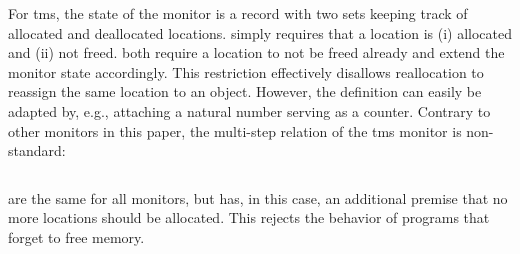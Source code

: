 \documentclass[utf8,acmsmall,review,screen,dvipsnames,anonymous]{acmart}
\begin{document}
For \gls*{tms}, the state of the monitor is a record with two sets keeping track of allocated and deallocated locations.
 simply requires that a location is (i) allocated and (ii) not freed.
 both require a location to not be freed already and extend the monitor state accordingly.
This restriction effectively disallows reallocation to reassign the same location to an object.
However, the definition can easily be adapted by, e.g., attaching a natural number serving as a counter.
Contrary to other monitors in this paper, the multi-step relation of the \gls*{tms} monitor is non-standard:
\begin{center}
  $\;$\\
\end{center}
 are the same for all monitors, but  has, in this case, an additional premise that no more locations should be allocated.
This rejects the behavior of programs that forget to free memory.
\end{document}
